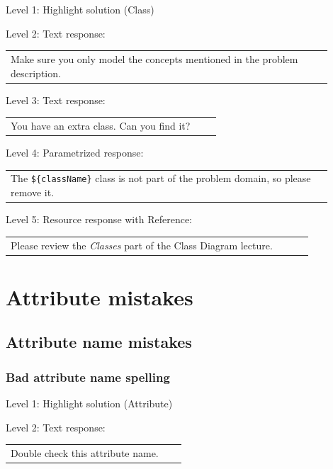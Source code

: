 \noindent Level 1: Highlight solution (Class) \medskip

\noindent Level 2: Text response: \medskip

\begin{tabular}{|p{0.9\linewidth}}
Make sure you only model the concepts mentioned in the problem description.
\end{tabular} \medskip

\noindent Level 3: Text response: \medskip

\begin{tabular}{|p{0.9\linewidth}}
You have an extra class. Can you find it?
\end{tabular} \medskip

\noindent Level 4: Parametrized response: \medskip

\begin{tabular}{|p{0.9\linewidth}}
The \verb|${className}| class is not part of the problem domain, so please remove it.
\end{tabular} \medskip

\noindent Level 5: Resource response with Reference: \medskip

\begin{tabular}{|p{0.9\linewidth}}
Please review the \textit{Classes} part of the Class Diagram lecture.
\end{tabular} \medskip



\section{Attribute mistakes}

\subsection{Attribute name mistakes}

\subsubsection{Bad attribute name spelling}

\noindent Level 1: Highlight solution (Attribute) \medskip

\noindent Level 2: Text response: \medskip

\begin{tabular}{|p{0.9\linewidth}}
Double check this attribute name.
\end{tabular} \medskip


